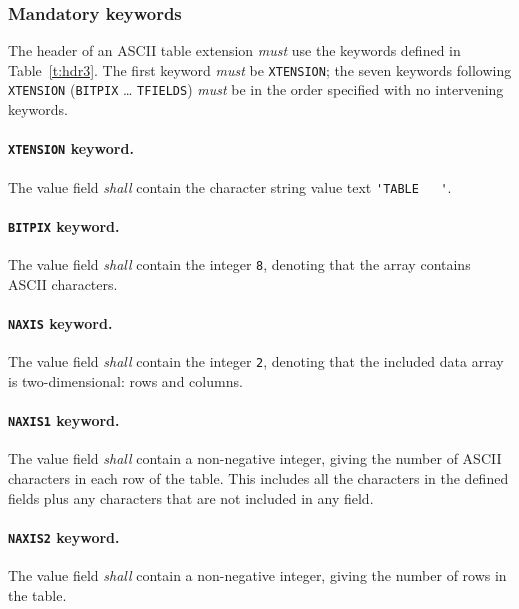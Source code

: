 \documentclass[onecolumn]{aa}
\begin{document}
   \subsubsection{Mandatory keywords}
       \label{s:atmk}
   The header of an ASCII table
   extension {\em must} use the keywords defined in Table~\ref{t:hdr3}.
   The first keyword {\em must} be {\tt XTENSION}; 
   the seven keywords following {\tt XTENSION} ({\tt BITPIX} \ldots
   {\tt TFIELDS}) {\em must} be in the 
   order specified
   with no intervening keywords.

  

   \paragraph{{\tt XTENSION} keyword.}
 The value field {\em shall} contain the
 character string value text \verb*+'TABLE   '+.
  
   \paragraph{{\tt BITPIX} keyword.}
 The value field {\em shall} contain the integer {\tt 8}, denoting
 that the array contains ASCII characters.  
  
   \paragraph{{\tt NAXIS} keyword.}
 The value field {\em shall} contain the integer {\tt 2}, denoting
 that the included data array is two-dimensional: rows and
 columns.
  
   \paragraph{{\tt NAXIS1} keyword.}
 The value field {\em shall} contain a non-negative integer, 
 giving
 the number of ASCII characters in each row of the table.
 This includes all the characters in the defined fields plus
 any characters that are not included in any field.
   
   \paragraph{{\tt NAXIS2} keyword.}
 The value field {\em shall} contain a non-negative integer, 
 giving
 the number of rows in the table.
  
\end{document}
